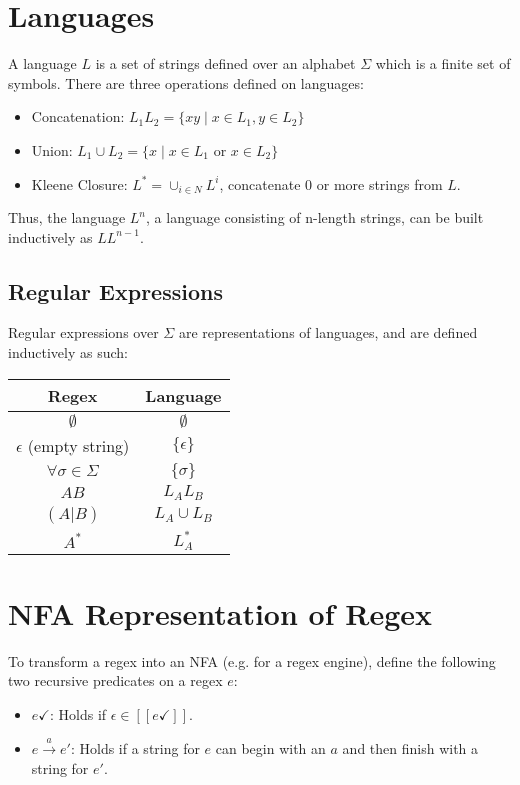 \documentclass[11pt]{article}
\begin{document}
\section{Languages}
	A language $L$ is a set of strings defined over an alphabet $\Sigma$ which is a finite set of symbols. There are three operations defined on languages:
	\begin{itemize}
		\item Concatenation: $L_1L_2 = \{xy \mid x \in L_1,  y \in L_2\}$
		\item Union: $L_1 \cup  L_2 = \{x \mid x \in L_1 \text{ or } x \in L_2\}$
		\item Kleene Closure: $L^* = \cup_{i\in N} L^i$, concatenate 0 or more strings from $L$.
	\end{itemize}
	Thus, the language $L^n$, a language consisting of n-length strings, can be built inductively as $LL^{n-1}$.
	
	\subsection{Regular Expressions}
		Regular expressions over $\Sigma$ are representations of languages, and are defined inductively as such:
		\begin{center}
		\begin{tabular}{c|c}
			Regex & Language\\\hline
			$\emptyset$ & $\emptyset$\\
			$\epsilon$ (empty string) & $\{\epsilon\}$\\
			$\forall \sigma \in \Sigma$ & $\{\sigma\}$\\
			$AB$ & $L_AL_B$\\
			$(A|B)$ & $L_A \cup L_B$\\
			$A^*$ & $L_A^*$
		\end{tabular}
		\end{center}
		
\section{NFA Representation of Regex}
	To transform a regex into an NFA (e.g. for a regex engine), define the following two recursive predicates on a regex $e$:
	\begin{itemize}
		\item $e\checkmark$: Holds if $\epsilon \in [[e\checkmark]]$.
		\item $e \xrightarrow{a} e'$: Holds if a string for $e$ can begin with an $a$ and then finish with a string for $e'$.
	\end{itemize}
	
\end{document}
